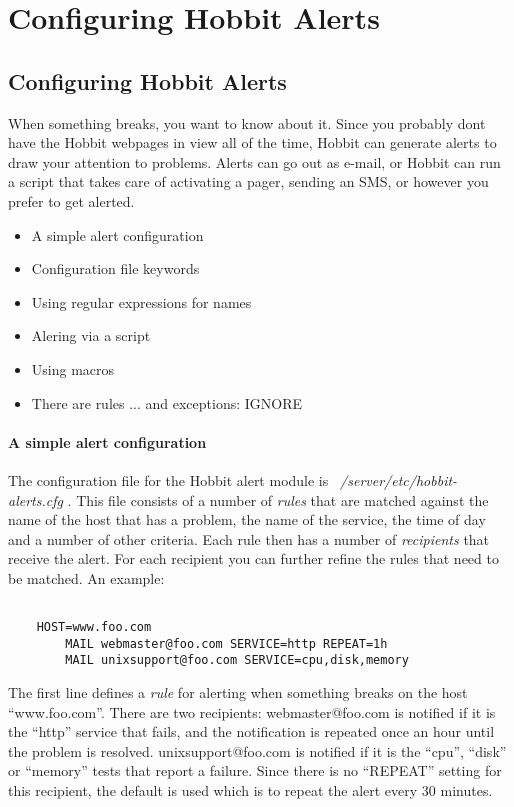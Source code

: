 \chapter{Configuring Hobbit Alerts}
\section{Configuring Hobbit Alerts}


 When something breaks, you want to know about it. Since you probably dont have the Hobbit webpages in view all of the time, Hobbit can generate alerts to draw your attention to problems. Alerts can go out as e-mail, or Hobbit can run a script that takes care of activating a pager, sending an SMS, or however you prefer to get alerted.
\begin{itemize}
\item A simple alert configuration
\item Configuration file keywords
\item Using regular expressions for names
\item Alering via a script
\item Using macros
\item There are rules ... and exceptions: IGNORE

\end{itemize}
\subsubsection{A simple alert configuration}


 The configuration file for the Hobbit alert module is \emph{~/server/etc/hobbit-alerts.cfg}
. This file consists of a number of \emph{rules}
 that are matched against the name of the host that has a problem, the name of the service, the time of day and a number of other criteria. Each rule then has a number of \emph{recipients}
 that receive the alert. For each recipient you can further refine the rules that need to be matched. An example:
\begin{verbatim}

	HOST=www.foo.com
		MAIL webmaster@foo.com SERVICE=http REPEAT=1h
		MAIL unixsupport@foo.com SERVICE=cpu,disk,memory

\end{verbatim}


 The first line defines a \emph{rule}
 for alerting when something breaks on the host ``www.foo.com''.
 There are two recipients: webmaster@foo.com is notified if it is the ``http'' service that fails, and the notification is repeated once an hour until the problem is resolved.
unixsupport@foo.com is notified if it is the ``cpu'', ``disk'' or ``memory'' tests that report a failure. Since there is no ``REPEAT'' setting for this recipient, the default is used which is to repeat the alert every 30 minutes.


